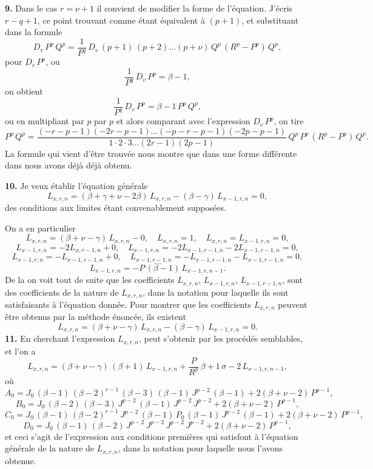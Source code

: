 \documentclass[11pt,a4paper]{article}
\begin{document}
\textbf{9.} Dans le cas $r=\nu+1$ il convient de modifier la forme de l'équation. J'écris $r-q+1$, ce point trouvant comme étant équivalent à $(p+1)$, et substituant dans la formule
\[
D_v\,P^p\,Q^p = \frac{1}{P^q}\,D_v\,(p+1)\,(p+2)\ldots(p+\nu)\,Q^p\,(R^p - P^p)\,Q^p,
\]
pour $D_v\,P^p$, ou
\[
\frac{1}{P^q}\,D_v\,P^p = \beta-1,
\]
on obtient
\[
\frac{1}{P^q}\,D_v\,P^p = \beta-1\,P^p\,Q^p,
\]
ou en multipliant par $p$ par $p$ et alors comparant avec l'expression $D_v\,P^p$, on tire
\[
P^p\,Q^p = \frac{(-r-p-1)(-2r-p-1)\ldots(-p-r-p-1)(-2p-p-1)}{1\cdot 2\cdot 3 \ldots (2r-1)(2p-1)} \,Q^p\,P^p\,(R^p - P^p)\,Q^p.
\]
La formule qui vient d'être trouvée nous montre que dans une forme différente dans nous avons déjà déjà obtenu.

\setcounter{page}{142}

\textbf{10.} Je veux établir l'équation générale
\[
L_{x,r,n} = (\beta + \gamma + \nu - 2\beta)\,L_{x,r,n} - (\beta - \gamma)\,L_{x-1,r,n} = 0,
\]
des conditions aux limites étant convenablement supposées.

On a en particulier
\[
L_{x,r,n} = (\beta + \nu - \gamma)\,L_{x,r,n} - 0,\quad L_{x,r,n} = 1,\quad L_{x,r,n} = L_{x-1,r,n} = 0,
\]
\[
L_{x-1,r,n} = -2L_{x,r-1,n} + 0,\quad L_{x-1,r,n} = -2L_{x-1,r-1,n} - 2L_{x-1,r-1,n} = 0,
\]
\[
L_{x-1,r,n} = -L_{x-1,r-1,n} + 0,\quad L_{x-1,r-1,n} = -L_{x-1,r-1,n} - L_{x-1,r-1,n} = 0,
\]
\[
\ldots
\]
\[
L_{x-1,r,n} = -P\,(\beta-1)\,L_{x-1,r,n-1}.
\]
De la on voit tout de suite que les coefficients $L_{x,r,n}$, $L_{x-1,r,n}$, $L_{x-1,r-1,n}$, sont des coefficients de la nature de $L_{x,r,n}$, dans la notation pour laquelle ils sont satisfaisants à l'équation donnée. Pour montrer que les coefficients $L_{x,r,n}$ peuvent être obtenus par la méthode énoncée, ils existent
\[
L_{x,r,n} = (\beta + \nu - \gamma)\,L_{x,r,n} - (\beta - \gamma)\,L_{x-1,r,n} = 0.
\]
\textbf{11.} En cherchant l'expression $L_{x,r,n}$, peut s'obtenir par les procédés semblables, et l'on a
\[
L_{x,r,n} = (\beta + \nu - \gamma)\,(\beta + 1)\,L_{x-1,r,n} + \frac{P}{R^p}\,\beta + 1\,\sigma - 2\,L_{x-1,r,n-1},
\]
où
\[
A_0 = J_0\,(\beta-1)\,(\beta-2)^{r-1}\,(\beta-3)\,(\beta-1)\,J^{p-2}\,(\beta-1) + 2(\beta+\nu-2)\,P^{p-1},
\]
\[
B_0 = J_0\,(\beta-2)\,(\beta-3)\,J^{p-2}\,(\beta-1)\,J^{p-2}\,J^{p-2} + 2(\beta+\nu-2)\,P^{p-1},
\]
\[
C_0 = J_0\,(\beta-1)\,(\beta-2)^{r-1}\,J^{p-2}\,(\beta-1)\,P_0\,(\beta-1)\,J^{p-2}\,(\beta-1) + 2(\beta+\nu-2)\,P^{p-1},
\]
\[
D_0 = J_0\,(\beta-1)\,(\beta-2)\,J^{p-2}\,J^{p-2}\,J^{p-2}\,J^{p-2} + 2(\beta+\nu-2)\,P^{p-1},
\]
et ceci s'agit de l'expression aux conditions premières qui satisfont à l'équation générale de la nature de $L_{x,r,n}$, dans la notation pour laquelle nous l'avons obtenue.
\end{document}
